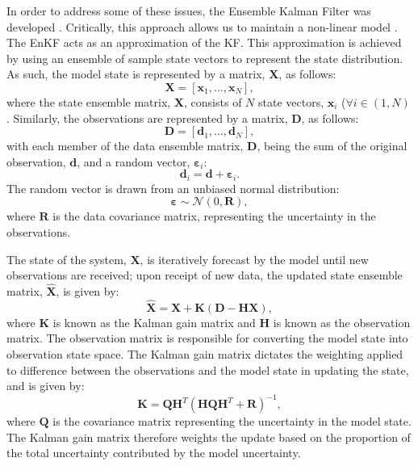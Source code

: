 \documentclass[12pt, twoside, a4paper]{article}
\begin{document}
In order to address some of these issues, the Ensemble Kalman Filter was
developed \citep{evensen2003ensemble, evensen2009ensemble}.
Critically, this approach allows us to maintain a non-linear model
\citep{wikle2007bayesian}.
The EnKF acts as an approximation of the KF.
This approximation is achieved by using an ensemble of sample state vectors to
represent the state distribution.
As such, the model state is represented by a matrix, $\mathbf{X}$, as follows:
\begin{equation}
    \mathbf{X} = \left[ \mathbf{x}_1, \ldots, \mathbf{x}_N \right],
\end{equation}
where the state ensemble matrix, $\mathbf{X}$, consists of $N$ state vectors,
$\mathbf{x}_i$ ($\forall i \in (1, N)$.
Similarly, the observations are represented by a matrix, $\mathbf{D}$, as
follows:
\begin{equation}
    \mathbf{D} = \left[ \mathbf{d}_1, \ldots, \mathbf{d}_N \right],
\end{equation}
with each member of the data ensemble matrix, $\mathbf{D}$, being the sum of the
original observation, $\mathbf{d}$, and a random vector,
$\mathbf{\varepsilon}_i$:
\begin{equation}
    \mathbf{d}_i = \mathbf{d} + \mathbf{\varepsilon}_i.
\end{equation}
The random vector is drawn from an unbiased normal distribution:
\begin{equation}
    \mathbf{\varepsilon} \sim \mathcal{N} 
                              \left( 0, \mathbf{R} \right),
\end{equation}
where $\mathbf{R}$ is the data covariance matrix, representing the uncertainty
in the observations.

The state of the system, $\mathbf{X}$, is iteratively forecast by the model until
new observations are received; upon receipt of new data, the updated state
ensemble matrix, $\hat{\mathbf{X}}$, is given by:
\begin{equation}
    \hat{\mathbf{X}} = \mathbf{X} + \mathbf{K}
                       \left(
                       \mathbf{D} - \mathbf{H} \mathbf{X}
                       \right),
\end{equation}
where $\mathbf{K}$ is known as the Kalman gain matrix and $\mathbf{H}$ is known
as the observation matrix.
The observation matrix is responsible for converting the model state into
observation state space.
The Kalman gain matrix dictates the weighting applied to difference between the
observations and the model state in updating the state, and is given by:
\begin{equation}
    \mathbf{K} = \mathbf{Q} \mathbf{H}^T
                 {\left(
                    \mathbf{H} \mathbf{Q} \mathbf{H}^T + \mathbf{R}
                 \right)} ^ {-1},
\end{equation}
where $\mathbf{Q}$ is the covariance matrix representing the uncertainty in the
model state.
The Kalman gain matrix therefore weights the update based on the proportion of
the total uncertainty contributed by the model uncertainty.
\end{document}
